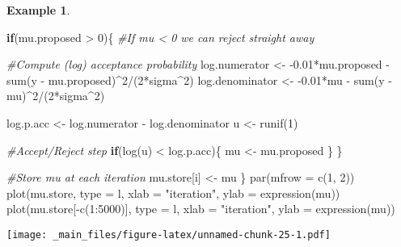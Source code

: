\documentclass[
]{book}
\newenvironment{Shaded}{\begin{snugshade}}{\end{snugshade}}
\newcommand{\AttributeTok}[1]{\textcolor[rgb]{0.77,0.63,0.00}{#1}}
\newcommand{\CommentTok}[1]{\textcolor[rgb]{0.56,0.35,0.01}{\textit{#1}}}
\newcommand{\ControlFlowTok}[1]{\textcolor[rgb]{0.13,0.29,0.53}{\textbf{#1}}}
\newcommand{\DecValTok}[1]{\textcolor[rgb]{0.00,0.00,0.81}{#1}}
\newcommand{\FloatTok}[1]{\textcolor[rgb]{0.00,0.00,0.81}{#1}}
\newcommand{\FunctionTok}[1]{\textcolor[rgb]{0.00,0.00,0.00}{#1}}
\newcommand{\NormalTok}[1]{#1}
\newcommand{\OtherTok}[1]{\textcolor[rgb]{0.56,0.35,0.01}{#1}}
\newcommand{\SpecialCharTok}[1]{\textcolor[rgb]{0.00,0.00,0.00}{#1}}
\newcommand{\StringTok}[1]{\textcolor[rgb]{0.31,0.60,0.02}{#1}}
\theoremstyle{definition}
\theoremstyle{definition}
\newtheorem{example}{Example}[chapter]
\theoremstyle{definition}
\theoremstyle{definition}
\theoremstyle{remark}
\begin{document}
\begin{example}
\begin{Shaded}
\begin{Highlighting}[]
  \ControlFlowTok{if}\NormalTok{(mu.proposed }\SpecialCharTok{\textgreater{}} \DecValTok{0}\NormalTok{)\{ }\CommentTok{\#If mu \textless{} 0 we can reject straight away}
    
    \CommentTok{\#Compute (log) acceptance probability}
\NormalTok{    log.numerator   }\OtherTok{\textless{}{-}} \SpecialCharTok{{-}}\FloatTok{0.01}\SpecialCharTok{*}\NormalTok{mu.proposed }\SpecialCharTok{{-}} \FunctionTok{sum}\NormalTok{(y }\SpecialCharTok{{-}}\NormalTok{ mu.proposed)}\SpecialCharTok{\^{}}\DecValTok{2}\SpecialCharTok{/}\NormalTok{(}\DecValTok{2}\SpecialCharTok{*}\NormalTok{sigma}\SpecialCharTok{\^{}}\DecValTok{2}\NormalTok{)}
\NormalTok{    log.denominator }\OtherTok{\textless{}{-}} \SpecialCharTok{{-}}\FloatTok{0.01}\SpecialCharTok{*}\NormalTok{mu }\SpecialCharTok{{-}} \FunctionTok{sum}\NormalTok{(y }\SpecialCharTok{{-}}\NormalTok{ mu)}\SpecialCharTok{\^{}}\DecValTok{2}\SpecialCharTok{/}\NormalTok{(}\DecValTok{2}\SpecialCharTok{*}\NormalTok{sigma}\SpecialCharTok{\^{}}\DecValTok{2}\NormalTok{)}
    
\NormalTok{    log.p.acc }\OtherTok{\textless{}{-}}\NormalTok{ log.numerator }\SpecialCharTok{{-}}\NormalTok{ log.denominator}
\NormalTok{    u }\OtherTok{\textless{}{-}} \FunctionTok{runif}\NormalTok{(}\DecValTok{1}\NormalTok{)}
    
    \CommentTok{\#Accept/Reject step}
    \ControlFlowTok{if}\NormalTok{(}\FunctionTok{log}\NormalTok{(u) }\SpecialCharTok{\textless{}}\NormalTok{ log.p.acc)\{}
\NormalTok{      mu }\OtherTok{\textless{}{-}}\NormalTok{ mu.proposed}
\NormalTok{    \}}
\NormalTok{  \}}
  
  \CommentTok{\#Store mu at each iteration}
\NormalTok{  mu.store[i] }\OtherTok{\textless{}{-}}\NormalTok{ mu}
\NormalTok{\}}
\FunctionTok{par}\NormalTok{(}\AttributeTok{mfrow =} \FunctionTok{c}\NormalTok{(}\DecValTok{1}\NormalTok{, }\DecValTok{2}\NormalTok{))}
\FunctionTok{plot}\NormalTok{(mu.store, }\AttributeTok{type =} \StringTok{\textquotesingle{}l\textquotesingle{}}\NormalTok{, }\AttributeTok{xlab =} \StringTok{"iteration"}\NormalTok{, }\AttributeTok{ylab =} \FunctionTok{expression}\NormalTok{(mu))}
\FunctionTok{plot}\NormalTok{(mu.store[}\SpecialCharTok{{-}}\FunctionTok{c}\NormalTok{(}\DecValTok{1}\SpecialCharTok{:}\DecValTok{5000}\NormalTok{)], }\AttributeTok{type =} \StringTok{\textquotesingle{}l\textquotesingle{}}\NormalTok{, }\AttributeTok{xlab =} \StringTok{"iteration"}\NormalTok{, }\AttributeTok{ylab =} \FunctionTok{expression}\NormalTok{(mu))}
\end{Highlighting}
\end{Shaded}

\texttt{[image: \_main\_files/figure-latex/unnamed-chunk-25-1.pdf]}
\end{example}
\end{document}
